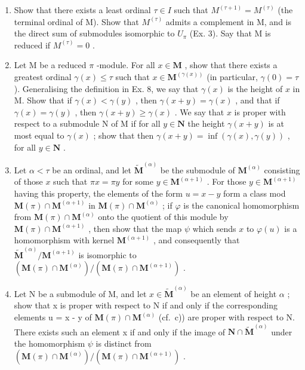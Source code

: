 \begin{enumerate}
\def\labelenumi{\alph{enumi})}
\item
  Show that there exists a least ordinal \(\tau \in I\) such that \(M^{(\tau + 1)} = M^{(\tau)}\) (the terminal ordinal of M). Show that \(M^{(\tau)}\) admits a complement in M, and is the direct sum of submodules isomorphic to \(U_{\pi}\) (Ex. 3). Say that M is reduced if \(M^{(\tau)} = 0\) .
\item
  Let M be a reduced \(\pi\) -module. For all \(x \in \mathbf{M}\) , show that there exists a greatest ordinal \(\gamma(x) \leqslant \tau\) such that \(x \in \mathbf{M}^{(\gamma(x))}\) (in particular, \(\gamma(0) = \tau\) ). Generalising the definition in Ex. 8, we say that \(\gamma(x)\) is the height of \(x\) in M. Show that if \(\gamma(x) < \gamma(y)\) , then \(\gamma(x + y) = \gamma(x)\) , and that if \(\gamma(x) = \gamma(y)\) , then \(\gamma(x + y) \geqslant \gamma(x)\) . We say that \(x\) is proper with respect to a submodule N of M if for all \(y \in \mathbf{N}\) the height \(\gamma(x + y)\) is at most equal to \(\gamma(x)\) ; show that then \(\gamma(x + y) = \inf(\gamma(x), \gamma(y))\) , for all \(y \in \mathbf{N}\) .
\item
  Let \(\alpha < \tau\) be an ordinal, and let \(\tilde{\mathbf{M}}^{(\alpha)}\) be the submodule of \(\mathbf{M}^{(\alpha)}\) consisting of those \(x\) such that \(\pi x = \pi y\) for some \(y \in \mathbf{M}^{(\alpha + 1)}\) . For those \(y \in \mathbf{M}^{(\alpha + 1)}\) having this property, the elements of the form \(u = x - y\) form a class mod \(\mathbf{M}(\pi) \cap \mathbf{M}^{(\alpha + 1)}\) in \(\mathbf{M}(\pi) \cap \mathbf{M}^{(\alpha)}\) ; if \(\varphi\) is the canonical homomorphism from \(\mathbf{M}(\pi) \cap \mathbf{M}^{(\alpha)}\) onto the quotient of this module by \(\mathbf{M}(\pi) \cap \mathbf{M}^{(\alpha + 1)}\) , then show that the map \(\psi\) which sends \(x\) to \(\varphi(u)\) is a homomorphism with kernel \(\mathbf{M}^{(\alpha + 1)}\) , and consequently that \(\tilde{\mathbf{M}}^{(\alpha)} / \mathbf{M}^{(\alpha + 1)}\) is isomorphic to \((\mathbf{M}(\pi) \cap \mathbf{M}^{(\alpha)}) / (\mathbf{M}(\pi) \cap \mathbf{M}^{(\alpha + 1)})\) .
\item
  Let N be a submodule of M, and let \(x \in \tilde{\mathbf{M}}^{(\alpha)}\) be an element of height \(\alpha\) ; show that x is proper with respect to N if and only if the corresponding elements u = x - y of \(\mathbf{M}(\pi) \cap \mathbf{M}^{(\alpha)}\) (cf.~c)) are proper with respect to N. There exists such an element x if and only if the image of \(\mathbf{N} \cap \tilde{\mathbf{M}}^{(\alpha)}\) under the homomorphism \(\psi\) is distinct from \((\mathbf{M}(\pi) \cap \mathbf{M}^{(\alpha)}) / (\mathbf{M}(\pi) \cap \mathbf{M}^{(\alpha + 1)})\) .
\end{enumerate}

